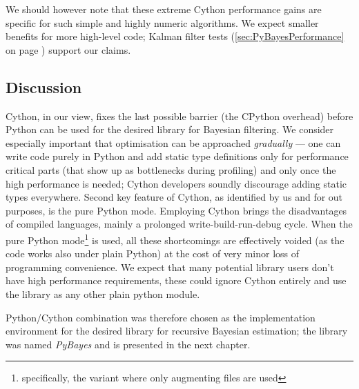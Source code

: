 We should however note that these extreme Cython performance gains are specific for such simple and
highly numeric algorithms. We expect smaller benefits for more high-level code; Kalman filter tests
(\autoref{sec:PyBayesPerformance} on page \pageref{sec:PyBayesPerformance}) support our claims.

\subsection{Discussion}

Cython, in our view, fixes the last possible barrier (the CPython overhead) before Python can be used
for the desired library for Bayesian filtering. We consider especially important that optimisation
can be approached \emph{gradually} --- one can write code purely in Python and add static type
definitions only for performance critical parts (that show up as bottlenecks during profiling) and
only once the high performance is needed; Cython developers soundly discourage adding static types
everywhere. Second key feature of Cython, as identified by us and for
out purposes, is the pure Python mode. Employing Cython brings the disadvantages of compiled languages,
mainly a prolonged write-build-run-debug cycle. When the pure Python mode\footnote{specifically, the
variant where only augmenting files are used} is used, all these shortcomings
are effectively voided (as the code works also under plain Python) at the cost of very minor loss
of programming convenience. We expect that many potential library users don't have high performance
requirements, these could ignore Cython entirely and use the library as any other plain python
module.

Python/Cython combination was therefore chosen as the implementation environment for the desired
library for recursive Bayesian estimation; the library was named \emph{PyBayes} and is presented in
the next chapter.
